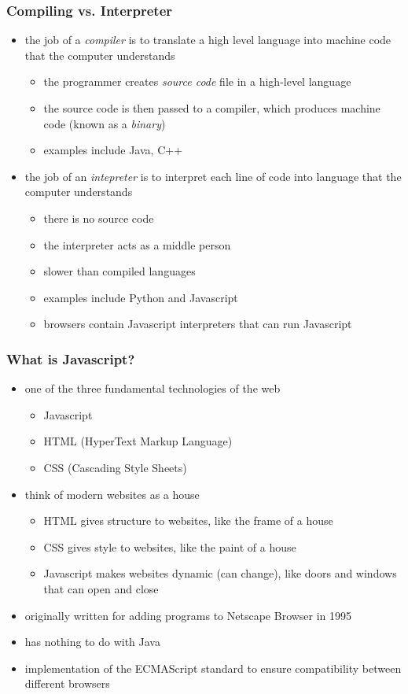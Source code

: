 \documentclass{beamer}
\begin{document}
\begin{frame}
\frametitle{Compiling vs. Interpreter}
\begin{itemize}
	\item {the job of a \emph{compiler} is to translate a high level language into machine code that the computer understands}	
	\begin{itemize}
		\item the programmer creates \emph{source code} file in a high-level language
		\item the source code is then passed to a compiler, which produces machine code (known as a \emph{binary})
		\item{examples include Java, C++}
	\end{itemize}
	\item{the job of an \emph{intepreter} is to interpret each line of code into language that the computer understands}
	\begin{itemize}
		\item there is no source code
		\item the interpreter acts as a middle person
		\item slower than compiled languages
		\item {examples include Python and Javascript}
		\item browsers contain Javascript interpreters that can run Javascript
	\end{itemize}
\end{itemize}
\end{frame}

\begin{frame}
	\frametitle{What is Javascript?}
	\begin{itemize}
		\item {one of the three fundamental technologies of the web}
			\begin{itemize}
				\item{Javascript}
				\item{HTML (HyperText Markup Language)}
				\item{CSS (Cascading Style Sheets)}
			\end{itemize}
		\item{think of modern websites as a house}
			\begin{itemize}
				\item HTML gives structure to websites, like the frame of a house
				\item CSS gives style to websites, like the paint of a house
				\item Javascript makes websites dynamic (can change), like doors and windows that can open and close
			\end{itemize}
		\item{originally written for adding programs to Netscape Browser in 1995}
		\item has nothing to do with Java
		\item implementation of the ECMAScript standard to ensure compatibility between different browsers
	\end{itemize}
\end{frame}
\end{document}
